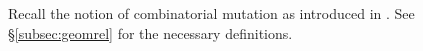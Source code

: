 \documentclass[11pt, oneside,dvipsnames]{amsart}
\newcommand{\<}{\langle}
\renewcommand{\>}{\rangle}
\newcommand{\bN}{\mathbb{N}}
\newcommand{\bP}{\mathbb{P}}
\newcommand{\cM}{\mathcal{M}}
\newcommand{\abc}{{(a,b,c)}}
\newtheorem{lemma}[Theorem]{Lemma}
\theoremstyle{definition}
\theoremstyle{definition}
\numberwithin{equation}{subsection}
\begin{document}







Recall the notion of combinatorial mutation as introduced in \cite{minksum}. See \S \ref{subsec:geomrel} for the necessary definitions.
\end{document}
